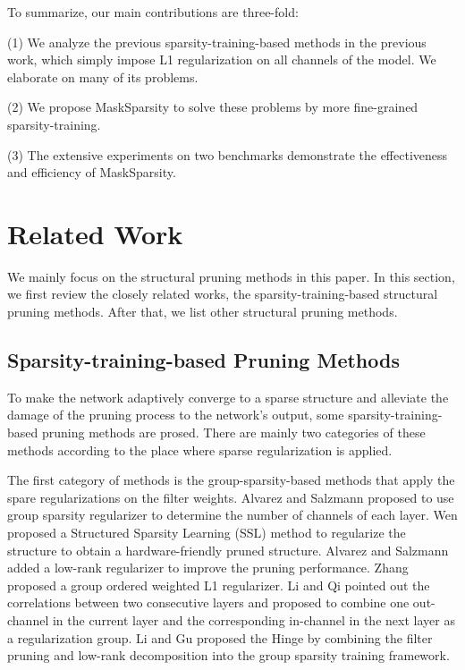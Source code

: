 \documentclass[review]{cvpr}
\begin{document}
To summarize, our main contributions are three-fold:

(1)	We analyze the previous sparsity-training-based methods in the previous work, which simply impose L1 regularization on all channels of the model. We elaborate on many of its problems.

(2)	We propose MaskSparsity to solve these problems by more fine-grained sparsity-training.

(3)	The extensive experiments on two benchmarks demonstrate the effectiveness and efficiency of MaskSparsity.



\section{Related Work}
We mainly focus on the structural pruning methods in this paper.
In this section, we first review the closely related works, \ie the sparsity-training-based structural pruning methods. After that, we list other structural pruning methods.

\subsection{Sparsity-training-based Pruning Methods}
To make the network adaptively converge to a sparse structure and alleviate the damage of the pruning process to the network's output, some sparsity-training-based pruning methods are prosed. There are mainly two categories of these methods according to the place where sparse regularization is applied. 

The first category of methods is the group-sparsity-based methods that apply the spare regularizations on the filter weights. Alvarez and Salzmann \cite{alvarez2016learning} proposed to use group sparsity regularizer to determine the number of channels of each layer. Wen \etal \cite{wen2016learning} proposed a Structured Sparsity Learning (SSL) method to regularize the structure to obtain a hardware-friendly pruned structure.  Alvarez and Salzmann \cite{alvarez2017compression} added a low-rank regularizer to improve the pruning performance. Zhang \etal proposed a group ordered weighted L1 regularizer. Li and Qi \cite{OICSROS} pointed out the correlations between two consecutive layers and proposed to combine one out-channel in the current layer and the corresponding in-channel in the next layer as a regularization group. Li and Gu proposed the Hinge \cite{Hinge} by combining the filter pruning and low-rank decomposition into the group sparsity training framework.
\end{document}
